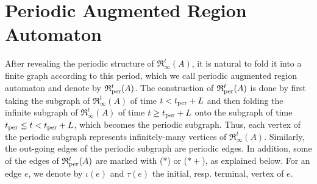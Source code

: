 \documentclass[11pt]{amsart}
\theoremstyle{definition}
\newcommand{\IARRR}{\mathfrak{R}_{\infty}^{t}}
\newcommand{\PARRR}{\mathfrak{R}_\textnormal{per}^{t}}
\begin{document}
\section{Periodic Augmented Region Automaton}
\label{sec:APARA}
After revealing the periodic structure of $\IARRR(A)$, it is natural to fold it into a finite graph according to this period, which we call periodic augmented region automaton and denote by $\PARRR(A)$.
The construction of $\PARRR(A)$ is done by first taking the subgraph of $\IARRR(A)$ of time $t < t_\textnormal{per} + L$ and then folding the infinite subgraph of $\IARRR(A)$ of time $t \geq t_\textnormal{per} + L$ onto the subgraph of time $t_\textnormal{per} \leq t < t_\textnormal{per} + L$, which becomes the periodic subgraph.
Thus, each vertex of the periodic subgraph represents infinitely-many vertices of $\IARRR(A)$.
Similarly, the out-going edges of the periodic subgraph are periodic edges.
In addition, some of the edges of $\PARRR(A)$ are marked with ($*$) or ($*+$), as explained below.
For an edge $e$, we denote by $\iota(e)$ and $\tau(e)$ the initial, resp. terminal, vertex of $e$. 
\end{document}
